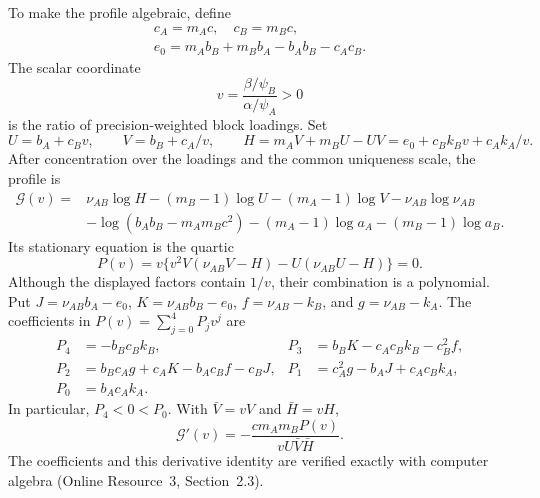 To make the profile algebraic, define
\[
\begin{gathered}
c_A=m_Ac,\quad c_B=m_Bc,\\
e_0=m_Ab_B+m_Bb_A-b_Ab_B-c_Ac_B.
\end{gathered}
\]
The scalar coordinate
\[
v=\frac{\beta/\psi_B}{\alpha/\psi_A}>0
\]
is the ratio of precision-weighted block loadings. Set
\[
U=b_A+c_Bv,\qquad V=b_B+c_A/v,\qquad
H=m_AV+m_BU-UV=e_0+c_Bk_Bv+c_Ak_A/v.
\]
After concentration over the loadings and the common uniqueness scale, the profile is
\begin{equation}
\begin{aligned}
\mathcal G(v)={}&\nu_{AB}\log H-(m_B-1)\log U-(m_A-1)\log V-\nu_{AB}\log \nu_{AB}\\
&-\log(b_Ab_B-m_Am_Bc^2)-(m_A-1)\log a_A-(m_B-1)\log a_B.
\end{aligned}
\label{eq:unequal-profile}
\end{equation}
Its stationary equation is the quartic
\begin{equation}
P(v)=v\{v^2V(\nu_{AB}V-H)-U(\nu_{AB}U-H)\}=0.
\label{eq:unequal-quartic}
\end{equation}
Although the displayed factors contain $1/v$, their combination is a polynomial. Put $J=\nu_{AB}b_A-e_0$, $K=\nu_{AB}b_B-e_0$, $f=\nu_{AB}-k_B$, and $g=\nu_{AB}-k_A$. The coefficients in $P(v)=\sum_{j=0}^4P_jv^j$ are
\begin{equation}
\begin{aligned}
P_4&=-b_Bc_Bk_B,&
P_3&=b_BK-c_Ac_Bk_B-c_B^2f,\\
P_2&=b_Bc_Ag+c_AK-b_Ac_Bf-c_BJ,&
P_1&=c_A^2g-b_AJ+c_Ac_Bk_A,\\
P_0&=b_Ac_Ak_A.&&
\end{aligned}
\label{eq:unequal-quartic-coefficients}
\end{equation}
In particular, $P_4<0<P_0$. With $\bar V=vV$ and $\bar H=vH$,
\[
\mathcal G'(v)=-\frac{cm_Am_BP(v)}{vU\bar V\bar H}.
\]
The coefficients and this derivative identity are verified exactly with computer algebra (Online Resource~3, Section~2.3).

